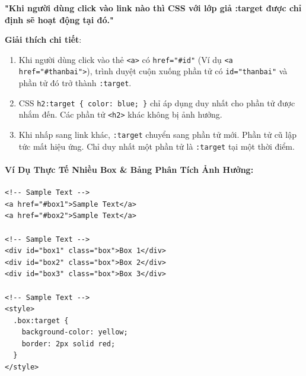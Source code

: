 \documentclass[11pt,oneside]{book}
\newcommand{\codeinline}[1]{\textcolor{accentOrange}{\texttt{#1}}}
\begin{document}
\begin{conceptBox}
\textbf{"Khi người dùng click vào link nào thì CSS với lớp giả :target được chỉ định sẽ hoạt động tại đó."}

\par\vspace{4pt}
\textbf{Giải thích chi tiết}:
\begin{enumerate}[leftmargin=1.5em, itemsep=2pt, parsep=0pt]
    \item Khi người dùng click vào thẻ \codeinline{<a>} có \codeinline{href="\#id"} (Ví dụ \codeinline{<a href="\#thanbai">}), trình duyệt cuộn xuống phần tử có \codeinline{id="thanbai"} và phần tử đó trở thành \codeinline{:target}.
    \item CSS \codeinline{h2:target \{ color: blue; \}} chỉ áp dụng duy nhất cho phần tử được nhắm đến. Các phần tử \codeinline{<h2>} khác không bị ảnh hưởng.
    \item Khi nhấp sang link khác, \codeinline{:target} chuyển sang phần tử mới. Phần tử cũ lập tức mất hiệu ứng. Chỉ duy nhất một phần tử là \codeinline{:target} tại một thời điểm.
\end{enumerate}
\end{conceptBox}

\paragraph{Ví Dụ Thực Tế Nhiều Box \& Bảng Phân Tích Ảnh Hưởng:}

\begin{codeWindow}
\begin{lstlisting}[language=HTML5]
<!-- Sample Text -->
<a href="#box1">Sample Text</a>
<a href="#box2">Sample Text</a>

<!-- Sample Text -->
<div id="box1" class="box">Box 1</div>
<div id="box2" class="box">Box 2</div>
<div id="box3" class="box">Box 3</div>

<!-- Sample Text -->
<style>
  .box:target {
    background-color: yellow;
    border: 2px solid red;
  }
</style>
\end{lstlisting}
\end{codeWindow}
\end{document}
